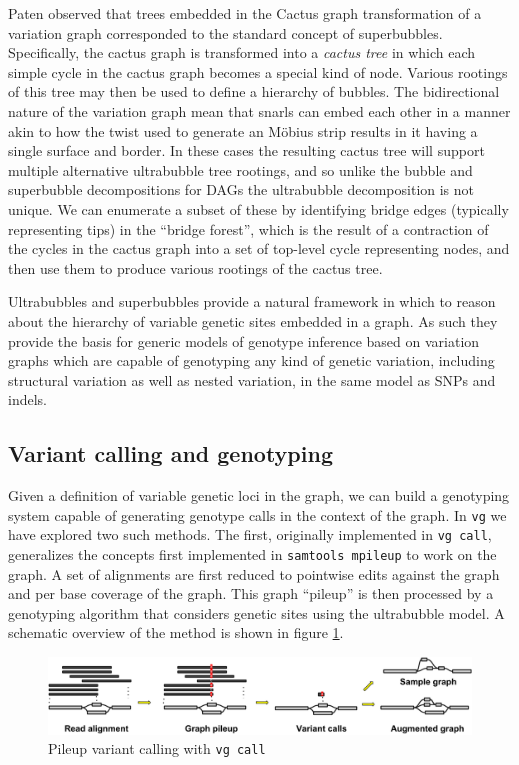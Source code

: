 \documentclass[a4paper,12pt,numbered,oneside]{Classes/PhDThesisPSnPDF}
\begin{document}
Paten observed that trees embedded in the Cactus graph transformation of a variation graph corresponded to the standard concept of superbubbles.
Specifically, the cactus graph is transformed into a \emph{cactus tree} in which each simple cycle in the cactus graph becomes a special kind of node.
Various rootings of this tree may then be used to define a hierarchy of bubbles.
The bidirectional nature of the variation graph mean that snarls can embed each other in a manner akin to how the twist used to generate an M\"{o}bius strip results in it having a single surface and border.
In these cases the resulting cactus tree will support multiple alternative ultrabubble tree rootings, and so unlike the bubble and superbubble decompositions for DAGs the ultrabubble decomposition is not unique.
We can enumerate a subset of these by identifying bridge edges (typically representing tips) in the ``bridge forest'', which is the result of a contraction of the cycles in the cactus graph into a set of top-level cycle representing nodes, and then use them to produce various rootings of the cactus tree.

Ultrabubbles and superbubbles provide a natural framework in which to reason about the hierarchy of variable genetic sites embedded in a graph.
As such they provide the basis for generic models of genotype inference based on variation graphs which are capable of genotyping any kind of genetic variation, including structural variation as well as nested variation, in the same model as SNPs and indels.

\subsection{Variant calling and genotyping}

Given a definition of variable genetic loci in the graph, we can build a genotyping system capable of generating genotype calls in the context of the graph.
In {\tt vg} we have explored two such methods.
The first, originally implemented in {\tt vg call}, generalizes the concepts first implemented in {\tt samtools mpileup} to work on the graph.
A set of alignments are first reduced to pointwise edits against the graph and per base coverage of the graph.
This graph ``pileup'' is then processed by a genotyping algorithm that considers genetic sites using the ultrabubble model.
A schematic overview of the method is shown in figure \ref{fig:vg_call}.

\begin{figure}[htbp!]
  \includegraphics[width=1.0\textwidth]{Chapter2/Figs/vg_call.pdf}
  \caption{
    Pileup variant calling with {\tt vg call}
    }
  \label{fig:vg_call}
\end{figure}
\end{document}
